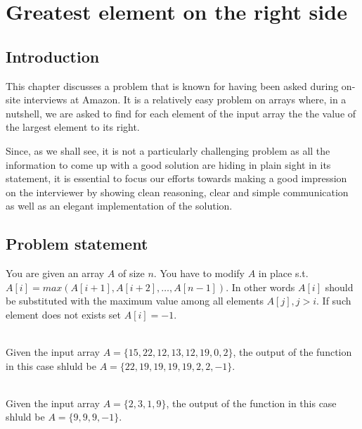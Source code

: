 %


\chapter{Greatest element on the right side}
\label{ch:greatest_right}
\section*{Introduction}
This chapter discusses a problem that is known for having been asked during on-site interviews at Amazon. 
It is a relatively easy problem on arrays where, in a nutshell, we are asked to find for each element of the input array the the value of the largest element to its right. 

Since, as we shall see, it is not a particularly challenging problem as all the information to come up with a good solution are hiding in plain sight in its statement, it is essential to focus our efforts towards making a good impression on the interviewer by showing clean reasoning, clear and simple communication as well as an elegant implementation of the solution.



\section{Problem statement}
\begin{exercise}
You are given an array $A$ of size $n$. You have to modify $A$ in place s.t. $A[i] = max(A[i+1], A[i+2],\ldots, A[n-1])$. In other words $A[i]$ should be substituted with  the maximum value among all elements $A[j], j > i$. If such element does not exists set $A[i] = -1$.

	\begin{example}
		\hfill \\
		Given the input array $A = \{15, 22, 12, 13, 12, 19, 0, 2\}$, the output of the function in this case shluld be  $A = \{22, 19, 19, 19, 19, 2, 2, -1\}$.
	\end{example}

	\begin{example}
		\hfill \\
		Given the input array $A = \{2, 3, 1, 9\}$, the output of the function in this case shluld be  $A = \{9, 9, 9, -1\}$.
	\end{example}

\end{exercise}


